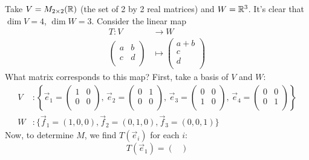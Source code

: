 \documentclass{../../template/note}
\begin{document}
    \begin{example}
        Take \(V = M_{2 \times 2}(\mathbb R)\) (the set of 2 by 2 real matrices) and \(W = \mathbb R^3\). It's clear that \(\dim V = 4\), \(\dim W = 3\). Consider the linear map
        \begin{align*}
            T: V &\to W \\
            \begin{pmatrix}
             a & b \\
             c & d \\
            \end{pmatrix} &\mapsto
            \begin{pmatrix}
             a+b \\
             c \\
             d \\
            \end{pmatrix}
        \end{align*}
        What matrix corresponds to this map? First, take a basis of \(V\) and \(W\):
        \begin{align*}
            V&: \left\{\vec e_1 = \begin{pmatrix}
             1 & 0 \\
             0 & 0 \\
            \end{pmatrix},\,
            \vec e_2 = \begin{pmatrix}
             0 & 1 \\
             0 & 0 \\
            \end{pmatrix},\,
            \vec e_3 = \begin{pmatrix}
             0 & 0 \\
             1 & 0 \\
            \end{pmatrix},\,
            \vec e_4 = \begin{pmatrix}
             0 & 0 \\
             0 & 1 \\
            \end{pmatrix}\right\} \\
            W&: \{\vec f_1 = (1, 0, 0), \vec f_2 = (0, 1, 0), \vec f_3 = (0, 0, 1)\}
        \end{align*}
        Now, to determine \(M\), we find \(T(\vec e_i)\) for each \(i\):
        \[
            T(\vec e_1) = \begin{pmatrix}

\end{pmatrix}\]
\end{example}
\end{document}
